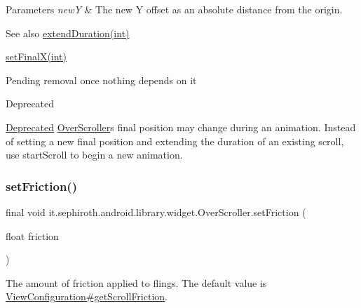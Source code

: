 \begin{DoxyParams}{Parameters}
{\em newY} & The new Y offset as an absolute distance from the origin. \\
\hline
\end{DoxyParams}
\begin{DoxySeeAlso}{See also}
\hyperlink{classit_1_1sephiroth_1_1android_1_1library_1_1widget_1_1_over_scroller_a94c0a3042a747b6212859cc06bf749d5}{extend\+Duration(int)} 

\hyperlink{classit_1_1sephiroth_1_1android_1_1library_1_1widget_1_1_over_scroller_a6cc75f4f959d10d938d62bbc2da639ed}{set\+Final\+X(int)}
\end{DoxySeeAlso}
Pending removal once nothing depends on it \begin{DoxyRefDesc}{Deprecated}
\item[\hyperlink{deprecated__deprecated000005}{Deprecated}]\hyperlink{classit_1_1sephiroth_1_1android_1_1library_1_1widget_1_1_over_scroller}{Over\+Scroller}\textquotesingle{}s final position may change during an animation. Instead of setting a new final position and extending the duration of an existing scroll, use start\+Scroll to begin a new animation. \end{DoxyRefDesc}
\mbox{\label{classit_1_1sephiroth_1_1android_1_1library_1_1widget_1_1_over_scroller_aa13283e67a913e82e6e80d87e1a3ae3c}} 
\subsubsection{\texorpdfstring{set\+Friction()}{setFriction()}}
{\footnotesize\ttfamily final void it.\+sephiroth.\+android.\+library.\+widget.\+Over\+Scroller.\+set\+Friction (\begin{DoxyParamCaption}\item[{float}]{friction }\end{DoxyParamCaption})}

The amount of friction applied to flings. The default value is \hyperlink{}{View\+Configuration\#get\+Scroll\+Friction}.


